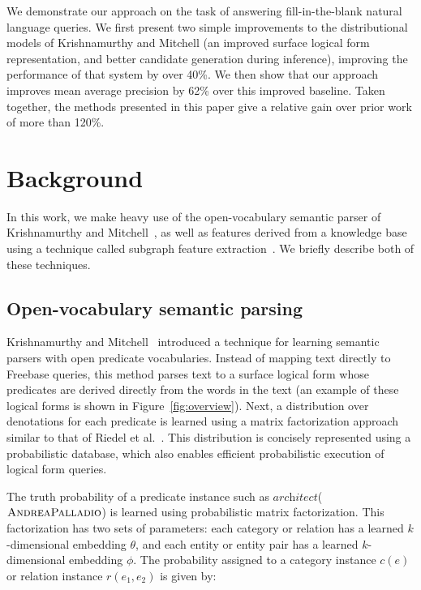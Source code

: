 \documentclass[11pt]{article}
\newcommand{\figref}[1]{Figure~\ref{fig:#1}}
\newcommand{\lexicalpredicate}[1]{\ensuremath{\textit{#1}}}
\newcommand{\entity}[1]{\ensuremath{\textsc{#1}}}
\begin{document}
We demonstrate our approach on the task of answering fill-in-the-blank
natural language queries.  We first present two simple improvements to
the distributional models of Krishnamurthy and Mitchell (an improved
surface logical form representation, and better candidate generation
during inference), improving the performance of that system by over
40\%.  We then show that our approach improves mean average precision
by 62\% over this improved baseline.  Taken together, the methods
presented in this paper give a relative gain over prior work of more
than 120\%.

\section{Background}
\label{sec:background}

In this work, we make heavy use of the open-vocabulary semantic parser
of Krishnamurthy and
Mitchell~, as
well as features derived from a knowledge base using a technique
called subgraph feature extraction~\cite{gardner-2015-sfe}.  We
briefly describe both of these techniques.

\subsection{Open-vocabulary semantic parsing}
\label{sec:jayant-semparse}

Krishnamurthy and
Mitchell~
introduced a technique for learning semantic parsers with open
predicate vocabularies. Instead of mapping text directly to Freebase
queries, this method parses text to a surface logical form whose
predicates are derived directly from the words in the text (an example
of these logical forms is shown in \figref{overview}). Next, a
distribution over denotations for each predicate is learned using a
matrix factorization approach similar to that of Riedel et
al.~. This distribution is
concisely represented using a probabilistic database, which also
enables efficient probabilistic execution of logical form queries.

The truth probability of a predicate instance such as
\lexicalpredicate{architect}(\entity{AndreaPalladio}) is learned using
probabilistic matrix factorization. This factorization has two sets of
parameters: each category or relation has a learned $k$-dimensional
embedding $\theta$, and each entity or entity pair has a learned
$k$-dimensional embedding $\phi$. The probability assigned to a
category instance $c(e)$ or relation instance $r(e_1, e_2)$ is given
by:
\end{document}
